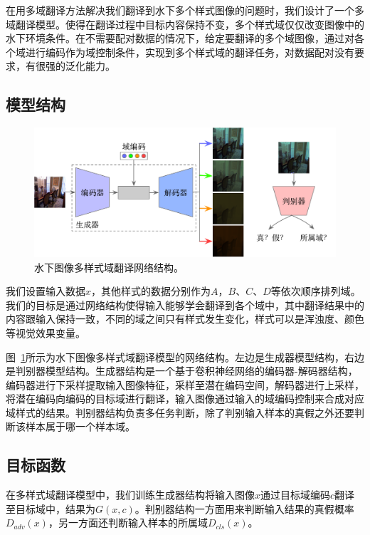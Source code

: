 在用多域翻译方法解决我们翻译到水下多个样式图像的问题时，我们设计了一个多域翻译模型。使得在翻译过程中目标内容保持不变，多个样式域仅仅改变图像中的水下环境条件。在不需要配对数据的情况下，给定要翻译的多个域图像，通过对各个域进行编码作为域控制条件，实现到多个样式域的翻译任务，对数据配对没有要求，有很强的泛化能力。

\subsection{模型结构}

\begin{figure}[ht]
    \centering
    \includegraphics[width=1\textwidth]{figures/Domain_network.pdf}
    \caption{水下图像多样式域翻译网络结构。}
    \label{fig:domain_net}
\end{figure}

我们设置输入数据$x$，其他样式的数据分别作为$A$，$B$、$C$、$D$等依次顺序排列域。我们的目标是通过网络结构使得输入能够学会翻译到各个域中，其中翻译结果中的内容跟输入保持一致，不同的域之间只有样式发生变化，样式可以是浑浊度、颜色等视觉效果变量。

图~\ref{fig:domain_net}所示为水下图像多样式域翻译模型的网络结构。左边是生成器模型结构，右边是判别器模型结构。生成器结构是一个基于卷积神经网络的编码器-解码器结构，编码器进行下采样提取输入图像特征，采样至潜在编码空间，解码器进行上采样，将潜在编码向编码的目标域进行翻译，输入图像通过输入的域编码控制来合成对应域样式的结果。判别器结构负责多任务判断，除了判别输入样本的真假之外还要判断该样本属于哪一个样本域。

\subsection{目标函数}
在多样式域翻译模型中，我们训练生成器结构将输入图像$x$通过目标域编码$c$翻译至目标域中，结果为$G(x,c)$。判别器结构一方面用来判断输入结果的真假概率$D_{adv}(x)$，另一方面还判断输入样本的所属域$D_{cls}(x)$。

